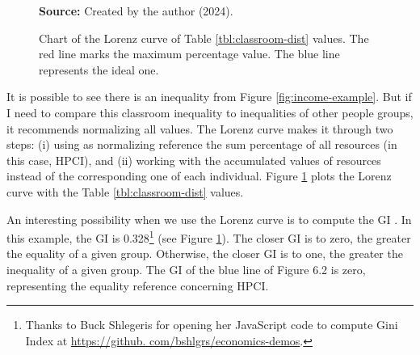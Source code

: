 \begin{figure}[ht!]
\centering

\caption{\textmd{Chart of the Lorenz curve of Table \ref{tbl:classroom-dist} values. The red line marks the maximum percentage value. The blue line represents the ideal one.}}
\label{fig:lorenz-curve-example}

\par\medskip\ABNTEXfontereduzida\selectfont\textbf{Source:} Created by the author (2024).
\end{figure}

It is possible to see there is an inequality from Figure \ref{fig:income-example}. But if I need to compare this classroom inequality to inequalities of other people groups, it recommends normalizing all values. The Lorenz curve makes it through two steps: (i) using as normalizing reference the sum percentage of all resources (in this case, \gls{HPCI}), and (ii) working with the accumulated values of resources instead of the corresponding one of each individual. Figure \ref{fig:lorenz-curve-example} plots the Lorenz curve with the Table \ref{tbl:classroom-dist} values. 

An interesting possibility when we use the Lorenz curve is to compute the \gls{GI} \cite{farris:2010}. In this example, the \gls{GI} is 0.328\footnote{Thanks to Buck Shlegeris for opening her JavaScript code to compute Gini Index at \url{https://github. com/bshlgrs/economics-demos}.} (see Figure \ref{fig:lorenz-curve-example}). The closer \gls{GI} is to zero, the greater the equality of a given group. Otherwise, the closer \gls{GI} is to one, the greater the inequality of a given group. The \gls{GI} of the blue line of Figure 6.2 is zero, representing the equality reference concerning \gls{HPCI}.

